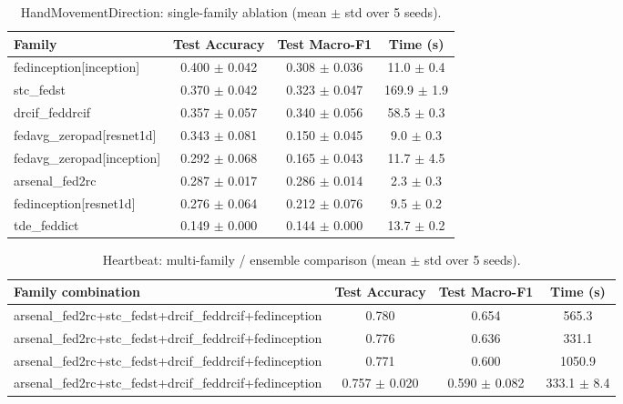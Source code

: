 \begin{table}[t]
\centering
\caption{HandMovementDirection: single-family ablation (mean $\pm$ std over 5 seeds).}
\label{tab:results_handmovementdirection_ablation}
\begin{tabular}{lccc}
\toprule
Family & Test Accuracy & Test Macro-F1 & Time (s) \\
\midrule
fedinception[inception] & 0.400 $\pm$ 0.042 & 0.308 $\pm$ 0.036 & 11.0 $\pm$ 0.4 \\
stc\_fedst & 0.370 $\pm$ 0.042 & 0.323 $\pm$ 0.047 & 169.9 $\pm$ 1.9 \\
drcif\_feddrcif & 0.357 $\pm$ 0.057 & 0.340 $\pm$ 0.056 & 58.5 $\pm$ 0.3 \\
fedavg\_zeropad[resnet1d] & 0.343 $\pm$ 0.081 & 0.150 $\pm$ 0.045 & 9.0 $\pm$ 0.3 \\
fedavg\_zeropad[inception] & 0.292 $\pm$ 0.068 & 0.165 $\pm$ 0.043 & 11.7 $\pm$ 4.5 \\
arsenal\_fed2rc & 0.287 $\pm$ 0.017 & 0.286 $\pm$ 0.014 & 2.3 $\pm$ 0.3 \\
fedinception[resnet1d] & 0.276 $\pm$ 0.064 & 0.212 $\pm$ 0.076 & 9.5 $\pm$ 0.2 \\
tde\_feddict & 0.149 $\pm$ 0.000 & 0.144 $\pm$ 0.000 & 13.7 $\pm$ 0.2 \\
\bottomrule
\end{tabular}
\end{table}

\begin{table}[t]
\centering
\caption{Heartbeat: multi-family / ensemble comparison (mean $\pm$ std over 5 seeds).}
\label{tab:results_heartbeat_ensemble}
\begin{tabular}{lccc}
\toprule
Family combination & Test Accuracy & Test Macro-F1 & Time (s) \\
\midrule
arsenal\_fed2rc+stc\_fedst+drcif\_feddrcif+fedinception & 0.780 & 0.654 & 565.3 \\
arsenal\_fed2rc+stc\_fedst+drcif\_feddrcif+fedinception & 0.776 & 0.636 & 331.1 \\
arsenal\_fed2rc+stc\_fedst+drcif\_feddrcif+fedinception & 0.771 & 0.600 & 1050.9 \\
arsenal\_fed2rc+stc\_fedst+drcif\_feddrcif+fedinception & 0.757 $\pm$ 0.020 & 0.590 $\pm$ 0.082 & 333.1 $\pm$ 8.4 \\
\bottomrule
\end{tabular}
\end{table}


